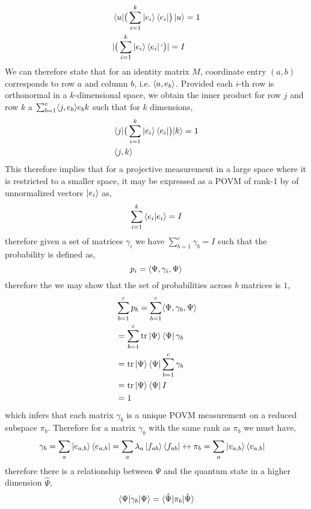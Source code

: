 \documentclass[7pt]{article}
\begin{document}
\begin{equation}
\begin{split}
& \bra{u}\bigr( \sum_{i=1}^k \ket{e_i}\bra{e_i} \bigr)\ket{u} = 1 \\
& |\bigr( \sum_{i=1}^k \ket{e_i}\bra{e_i}` \bigr)|  = I
\end{split}
\end{equation}
We can therefore state that for an identity matrix $M$, coordinate entry $(a,b)$ corresponds to row $a$ and column $b$, i.e. $\inn{a,e_b}$. Provided each  $i$-th row is orthonormal in a $k$-dimensional space, we obtain the inner product for row $j$ and row $k$ a $\sum_{b=1}^{c} \inn{j,e_b} e_b k$ such that for $k$ dimensions,
\begin{equation}
\begin{split}
& \inn{j |\bigr( \sum_{i=1}^k \ket{e_i}\bra{e_i} \bigr)| k} = 1 \\
& \inn{j,k}
\end{split}
\end{equation}
This therefore implies that for a projective measurement in a large space where it is restricted to a smaller space, it may be expressed as a  POVM of rank-1 by of unnormalized vectors $\ket{e_i}$ as,
\begin{equation}
\sum_{i=1}^k \bra{e_i}\ket{e_i}   = I
\end{equation}
therefore given a set of matrices $\gamma_i$ we have $\sum_{b=1}^{c} \gamma_b = I$ such that the probability is defined as,
$$
p_i = \inn{\Psi,\gamma_i,\Psi}
$$
therefore the we may show that the set of probabilities across $b$ matrices is  $1$,
\begin{equation}
\begin{split}
& \sum_{b=1}^{c} p_b = \sum_{b=1}^{c} \inn{\Psi,\gamma_b,\Psi} \\
& = \sum_{b=1}^{c} \text{tr} \ket{\Psi}\bra{\Psi} \gamma_b \\
& =  \text{tr} \ket{\Psi}\bra{\Psi} \sum_{b=1}^{c} \gamma_b \\
& =  \text{tr} \ket{\Psi}\bra{\Psi} I\\
& = 1
\end{split}
\end{equation}
which infers that each matrix $\gamma_b$ is a unique POVM measurement on a reduced subspace $\pi_b$. Therefore for a matrix $\gamma_b$ with the same rank as $\pi_b$ we must have,
\begin{equation}
\begin{split}
\gamma_b & = \sum_a \ket{e_{a,b}}\bra{e_{a,b}} =  \sum_a \lambda_a \ket{f_{ab}}\bra{f_{ab}} \leftrightarrow  \pi_b = \sum_a \ket{v_{a,b}}\bra{v_{a,b}}
\end{split}
\end{equation}
therefore there is a relationship between ${\Psi}$ and the quantum state in a higher dimension $\hat{\Psi}$,
\begin{equation}
\begin{split}
\inn{\Psi|\gamma_b|\Psi}=\inn{\hat{\Psi}|\pi_b|\hat{\Psi}}
\end{split}
\end{equation}
\end{document}
